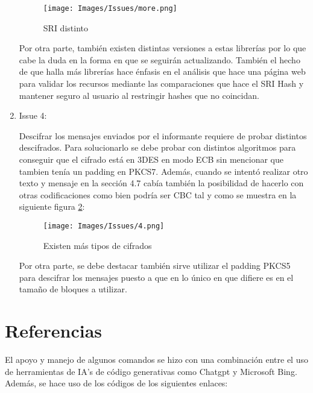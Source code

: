 \documentclass[letter,12pt]{article}
\begin{document}
\begin{enumerate}
\begin{figure}[H]
    \centering
    \texttt{[image: Images/Issues/more.png]}
    \caption{SRI distinto}
    \label{fig:more}
\end{figure}

Por otra parte, también existen distintas versiones a estas librerías por lo que cabe la duda en la forma en que se seguirán actualizando. También el hecho de que halla más librerías hace énfasis en el análisis que hace una página web para validar los recursos mediante las comparaciones que hace el SRI Hash y mantener seguro al usuario al restringir hashes que no coincidan.


\item Issue 4:

Descifrar los mensajes enviados por el informante requiere de probar distintos descifrados. Para solucionarlo se debe probar con distintos algoritmos para conseguir que el cifrado está en 3DES en modo ECB sin mencionar que tambien tenía un padding en PKCS7. Además, cuando se intentó realizar otro texto y mensaje en la sección 4.7 cabía también la posibilidad de hacerlo con otras codificaciones como bien podría ser CBC tal y como se muestra en la siguiente figura \ref{fig:more2}:

\begin{figure}[H]
    \centering
    \texttt{[image: Images/Issues/4.png]}
    \caption{Existen más tipos de cifrados}
    \label{fig:more2}
\end{figure}

Por otra parte, se debe destacar también sirve utilizar el padding PKCS5 para descifrar los mensajes puesto a que en lo único en que difiere es en el tamaño de bloques a utilizar.



\end{enumerate}



\clearpage

\section{Referencias}

El apoyo y manejo de algunos comandos se hizo con una combinación entre el uso de herramientas de IA's de código generativas como Chatgpt y Microsoft Bing. Además, se hace uso de los códigos de los siguientes enlaces:
\end{document}
